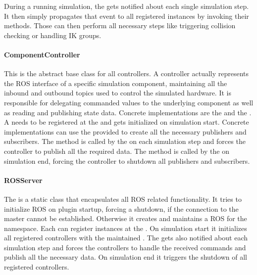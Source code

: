 During a running simulation, the  gets notified about each single simulation step. It then simply propagates that event to all registered  instances by invoking their  methods. Those can then perform all necessary steps like triggering collision checking or handling IK groups.

\paragraph{ComponentController}

This is the abstract base class for all controllers. A controller actually represents the ROS interface of a specific simulation component, maintaining all the inbound and outbound topics used to control the simulated hardware. It is responsible for delegating commanded values to the underlying component as well as reading and publishing state data. Concrete implementations are the  and the . A  needs to be registered at the  and gets initialized on simulation start. Concrete implementations can use the provided  to create all the necessary publishers and subscribers. The  method is called by the  on each simulation step and forces the controller to publish all the required data. The  method is called by the  on simulation end, forcing the controller to shutdown all publishers and subscribers.
  
\paragraph{ROSServer}

The  is a static class that encapsulates all ROS related functionality. It tries to initialize ROS on plugin startup, forcing a shutdown, if the connection to the master cannot be established. Otherwise it creates and maintains a ROS  for the  namespace. Each  can register  instances at the . On simulation start it initializes all registered controllers with the maintained . The  gets also notified about each simulation step and forces the controllers to handle the received commands and publish all the necessary data. On simulation end it triggers the shutdown of all registered controllers.

